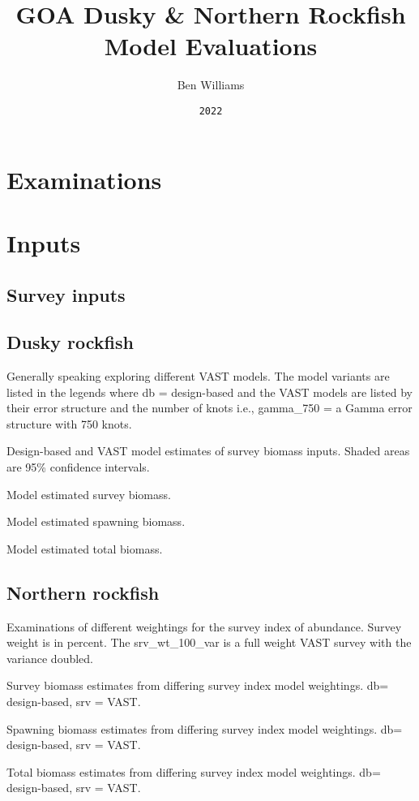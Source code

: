 \documentclass[
]{book}
\title{GOA Dusky \& Northern Rockfish Model Evaluations}
\author{Ben Williams}
\date{\texttt{2022}}
\begin{document}
\maketitle

{
\setcounter{tocdepth}{1}
\tableofcontents
}
\hypertarget{examinations}{%
\chapter{Examinations}\label{examinations}}

\hypertarget{inputs}{%
\chapter{Inputs}\label{inputs}}

\hypertarget{survey-inputs}{%
\section{Survey inputs}\label{survey-inputs}}

\hypertarget{dusky-rockfish}{%
\section{Dusky rockfish}\label{dusky-rockfish}}

Generally speaking exploring different VAST models.
The model variants are listed in the legends where db = design-based and the VAST models are listed by their error structure and the number of knots i.e., gamma\_750 = a Gamma error structure with 750 knots.

\label{fig:unnamed-chunk-3}Design-based and VAST model estimates of survey biomass inputs. Shaded areas are 95\% confidence intervals.

\label{fig:unnamed-chunk-4}Model estimated survey biomass.

\label{fig:unnamed-chunk-5}Model estimated spawning biomass.

\label{fig:unnamed-chunk-6}Model estimated total biomass.

\hypertarget{northern-rockfish}{%
\section{Northern rockfish}\label{northern-rockfish}}

Examinations of different weightings for the survey index of abundance.
Survey weight is in percent.
The srv\_wt\_100\_var is a full weight VAST survey with the variance doubled.

\label{fig:unnamed-chunk-7}Survey biomass estimates from differing survey index model weightings. db= design-based, srv = VAST.

\label{fig:unnamed-chunk-8}Spawning biomass estimates from differing survey index model weightings. db= design-based, srv = VAST.

\label{fig:unnamed-chunk-9}Total biomass estimates from differing survey index model weightings. db= design-based, srv = VAST.

  
\end{document}
